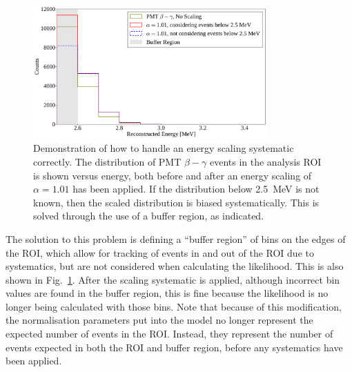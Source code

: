 \begin{figure}
    \centering
    \includegraphics[width=0.8\textwidth]{6_SolarAnalysis/images/buffer_region_demonstration_PMT_beta_gammas.pdf}
    \caption[Demonstration of how to handle an energy scaling systematic correctly]
    {Demonstration of how to handle an energy scaling systematic correctly. The distribution of PMT $\beta-\gamma$ events in the analysis ROI is shown versus energy, both before and after an energy scaling of $\alpha = 1.01$ has been applied. If the distribution below \SI{2.5}{\MeV} is not known, then the scaled distribution is biased systematically. This is solved through the use of a buffer region, as indicated.}
    \label{fig:energy_scaling_example}
\end{figure}

The solution to this problem is defining a ``buffer region'' of bins on the edges of the ROI, which allow for tracking of events in and out of the ROI due to systematics, but are not considered when calculating the likelihood. This is also shown in Fig.~\ref{fig:energy_scaling_example}. After the scaling systematic is applied, although incorrect bin values are found in the buffer region, this is fine because the likelihood is no longer being calculated with those bins. Note that because of this modification, the normalisation parameters put into the model no longer represent the expected number of events in the ROI. Instead, they represent the number of events expected in both the ROI and buffer region, before any systematics have been applied.


